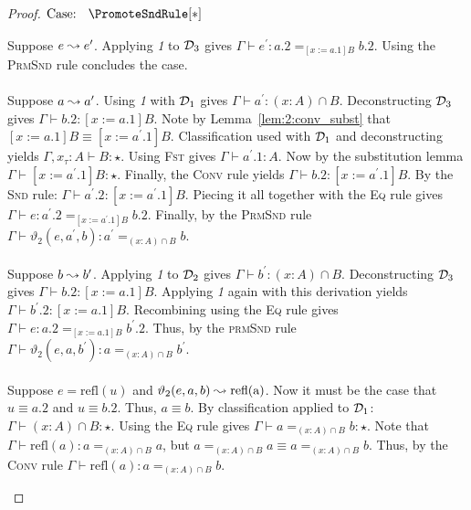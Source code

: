 \begin{proof}
    $\text{Case: }\begin{array}{c} \PromoteSndRule[*] \end{array}$
    \begin{proofcase}
        Suppose $e \leadsto e^\prime$.
        Applying \textit{1} to $\mathcal{D}_{3}$ gives $\Gamma \vdash e^\prime : a.2 =_{[x := a.1]B} b.2$.
        Using the \textsc{PrmSnd} rule concludes the case.
        \\ \\
        Suppose $a \leadsto a^\prime$.
        Using \textit{1} with $\mathcal{D}_{1}$ gives $\Gamma \vdash a^\prime : (x : A) \cap B$.
        Deconstructing $\mathcal{D}_{3}$ gives $\Gamma \vdash b.2 : [x := a.1]B$.
        Note by Lemma~\ref{lem:2:conv_subst} that $[x := a.1]B \equiv [x := a^{\prime}.1]B$.
        Classification used with $\mathcal{D}_{1}$ and deconstructing yields $\Gamma, x_\tau : A \vdash B : \star$.
        Using \textsc{Fst} gives $\Gamma \vdash a^{\prime}.1 : A$.
        Now by the substitution lemma $\Gamma \vdash [x := a^{\prime}.1]B : \star$.
        Finally, the \textsc{Conv} rule yields $\Gamma \vdash b.2 : [x := a^{\prime}.1]B$.
        By the \textsc{Snd} rule: $\Gamma \vdash a^{\prime}.2 : [x := a^{\prime}.1]B$.
        Piecing it all together with the \textsc{Eq} rule gives $\Gamma \vdash e : a^{\prime}.2 =_{[x := a^{\prime}.1]B} b.2$.
        Finally, by the \textsc{PrmSnd} rule $\Gamma \vdash \vartheta_2(e, a^\prime, b) : a^\prime =_{(x : A) \cap B} b$.
        \\ \\
        Suppose $b \leadsto b^\prime$.
        Applying \textit{1} to $\mathcal{D}_{2}$ gives $\Gamma \vdash b^\prime : (x : A) \cap B$.
        Deconstructing $\mathcal{D}_{3}$ gives $\Gamma \vdash b.2 : [x := a.1]B$.
        Applying \textit{1} again with this derivation yields $\Gamma \vdash b^{\prime}.2 : [x := a.1]B$.
        Recombining using the \textsc{Eq} rule gives $\Gamma \vdash e : a.2 =_{[x := a.1]B} b^{\prime}.2$.
        Thus, by the \textsc{prmSnd} rule $\Gamma \vdash \vartheta_2(e, a, b^\prime) : a =_{(x : A) \cap B} b^\prime$.
        \\ \\
        Suppose $e = \text{refl}(u)$ and $\vartheta_2(e, a, b) \leadsto \text{refl(a)}$.
        Now it must be the case that $u \equiv a.2$ and $u \equiv b.2$.
        Thus, $a \equiv b$.
        By classification applied to $\mathcal{D}_{1}$: $\Gamma \vdash (x : A) \cap B : \star$.
        Using the \textsc{Eq} rule gives $\Gamma \vdash a =_{(x : A) \cap B} b : \star$.
        Note that $\Gamma \vdash \text{refl}(a) : a =_{(x : A) \cap B} a$, but $a =_{(x : A) \cap B} a \equiv a =_{(x : A) \cap B} b$.
        Thus, by the \textsc{Conv} rule $\Gamma \vdash \text{refl}(a) : a =_{(x : A) \cap B} b$.
    \end{proofcase}


\end{proof}
